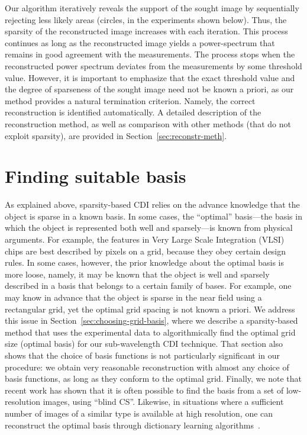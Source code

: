 Our algorithm iteratively reveals the support of the sought image by
sequentially rejecting less likely areas (circles, in the experiments
shown below). Thus, the sparsity of the reconstructed image increases
with each iteration. This process continues as long as the
reconstructed image yields a power-spectrum that remains in good
agreement with the measurements. The process stops when the
reconstructed power spectrum deviates from the measurements by some
threshold value. However, it is important to emphasize that the exact
threshold value and the degree of sparseness of the sought image need
not be known a priori, as our method provides a natural termination
criterion. Namely, the correct reconstruction is identified
automatically. A detailed description of the reconstruction method, as
well as comparison with other methods (that do not exploit sparsity),
are provided in Section~\ref{sec:reconstr-meth}.


\section{Finding suitable basis}
\label{sec:find-suit-basis}
As explained above, sparsity-based CDI relies on the advance knowledge
that the object is sparse in a known basis. In some cases, the
``optimal'' basis---the basis in which the object is represented both
well and sparsely---is known from physical arguments. For example, the
features in Very Large Scale Integration (VLSI) chips are best
described by pixels on a grid, because they obey certain design
rules. In some cases, however, the prior knowledge about the optimal
basis is more loose, namely, it may be known that the object is well
and sparsely described in a basis that belongs to a certain family of
bases. For example, one may know in advance that the object is sparse
in the near field using a rectangular grid, yet the optimal grid
spacing is not known a priori. We address this issue in
Section~\ref{sec:choosing-grid-basis},  where we describe a sparsity-based
method that uses the experimental data to algorithmically find the
optimal grid size (optimal basis) for our sub-wavelength CDI
technique. That section also shows that the choice of basis functions
is not particularly significant in our procedure: we obtain very
reasonable reconstruction with almost any choice of basis functions,
as long as they conform to the optimal grid. Finally, we note that
recent work has shown that it is often possible to find the basis from
a set of low-resolution images, using ``blind
CS''\cite{gleichman10blind}.
Likewise, in
situations where a sufficient number of images of a similar type is
available at high resolution, one can reconstruct the optimal basis
through dictionary learning algorithms~.



